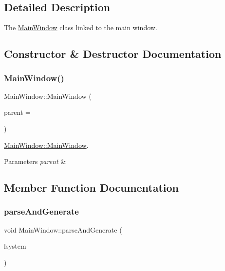 \subsection{Detailed Description}
The \hyperlink{classMainWindow}{Main\+Window} class linked to the main window. 

\subsection{Constructor \& Destructor Documentation}
\mbox{\label{classMainWindow_a8b244be8b7b7db1b08de2a2acb9409db}} 
\subsubsection{\texorpdfstring{Main\+Window()}{MainWindow()}}
{\footnotesize\ttfamily Main\+Window\+::\+Main\+Window (\begin{DoxyParamCaption}\item[{Q\+Widget $\ast$}]{parent = {} }\end{DoxyParamCaption})\hspace{0.3cm}{\ttfamily [explicit]}}



\hyperlink{classMainWindow_a8b244be8b7b7db1b08de2a2acb9409db}{Main\+Window\+::\+Main\+Window}. 


\begin{DoxyParams}{Parameters}
{\em parent} & \\
\hline
\end{DoxyParams}


\subsection{Member Function Documentation}
\mbox{\label{classMainWindow_ae5c8940ac8e440ba3a5523d6ba149938}} 
\subsubsection{\texorpdfstring{parse\+And\+Generate}{parseAndGenerate}}
{\footnotesize\ttfamily void Main\+Window\+::parse\+And\+Generate (\begin{DoxyParamCaption}\item[{\hyperlink{classLSystem}{L\+System} $\ast$}]{lsystem }\end{DoxyParamCaption})\hspace{0.3cm}{\ttfamily [signal]}}




